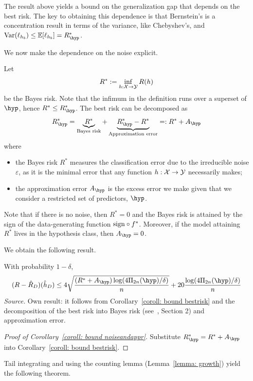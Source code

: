 \documentclass[reqno]{amsart}
\begin{document}
The result above yields a bound on the generalization gap that depends on the best risk. The key to obtaining this dependence is that Bernstein's is a concentration result in terms of the variance, like Chebyshev's, and $\Var(\ell_{h_b}) \le \expv[\ell_{h_b}] = R^*_\hyp$. 

We now make the dependence on the noise explicit. 

Let
\[
R^* := \inf_{h:\mathcal{X}\to\mathcal{Y}} R(h)
\] 
be the Bayes risk. Note that the infimum in the definition runs over a superset of $\hyp$, hence $R^* \le R^*_\hyp$. The best risk can be decomposed as 
\[
R^*_\hyp = \underbrace{R^*}_{\text{Bayes risk}} + \underbrace{R^*_\hyp - R^*}_{\text{Approximation error}} =: R^* + A_\hyp
\]
where
\begin{itemize}
\item the Bayes risk $R^*$ measures the classification error due to the irreducible noise $\varepsilon$, as it is the minimal error that any function $h:\mathcal{X}\to\mathcal{Y}$ necessarily makes;
\item the approximation error $A_\hyp$ is the excess error we make given that we consider a restricted set of predictors, $\hyp$.
\end{itemize}
Note that if there is no noise, then $R^* = 0$ and the Bayes risk is attained by the sign of the data-generating function $\mathrm{sign} \circ f^*$. Moreover, if the model attaining $R^*$ lives in the hypothesis class, then $A_\hyp = 0$.  

We obtain the following result. 

\begin{corollary}\label{coroll: bound noiseandappr}
With probability $1-\delta$,
\[
    (R - \hat R_D)(\hat h_D) \le 4\sqrt{\frac{( R^*+A_\hyp)\log(4\Pi_{2n}(\hyp)/\delta)}{n}} + 20\frac{\log(4\Pi_{2n}(\hyp)/\delta)}{n}
\]
\textnormal{\emph{Source.} Own result: it follows from Corollary~\ref{coroll: bound bestrisk} and the decomposition of the best risk into Bayes risk (see~\cite{boucheron2005theory}, Section 2) and approximation error.}

\begin{proof}[Proof of Corollary~\ref{coroll: bound noiseandappr}]
  Substitute $R^*_\hyp = R^* + A_\hyp$ into Corollary~\ref{coroll: bound bestrisk}.
\end{proof}
\end{corollary}

Tail integrating and using the counting lemma (Lemma~\ref{lemma: growth}) yield the following theorem. 
\end{document}
